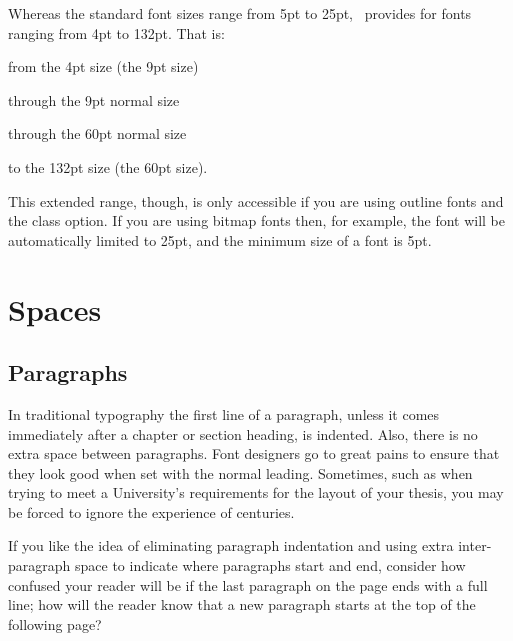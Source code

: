     Whereas the standard font sizes range from 5pt to 25pt, \Mname\  
provides for fonts ranging from 4pt to 132pt. That is: \par
{\fontsize{4}{5}\selectfont from the 4pt size (the 9pt  size)} \par
{\fontsize{9}{10}\selectfont through the 9pt normal size\raggedright\par}%
{\fontsize{60}{72}\selectfont through the 60pt normal size\raggedright\par}%
{\fontsize{132}{160}\selectfont \raggedright to the 132pt size (the 60pt
\cs{HUGE} size).\raggedright\par}


This extended range, though,
is only accessible if you are using outline fonts
and the \Lopt{extrafontsizes} class option.
If you are using bitmap fonts then, for example,
the \cmd{\HUGE} font will be automatically limited to 25pt, and the minimum
size of a \cmd{\miniscule} font is 5pt.


\section{Spaces}

\subsection{Paragraphs}

    In traditional typography the first line of a paragraph, unless it comes
immediately after a chapter or section heading, is indented. Also, there
is no extra space between paragraphs. Font designers go to great pains
to ensure that they look good when set with the normal leading. Sometimes,
such as when trying to meet a University's requirements for the layout
of your thesis, you may be forced to ignore the experience of centuries.

   If you like the idea of eliminating paragraph indentation and using extra
inter-paragraph space to indicate where paragraphs start and end, consider how
confused your reader will be if the last paragraph on the page ends with a full
line; how will the reader know that a new paragraph starts at the top of
the following page?

